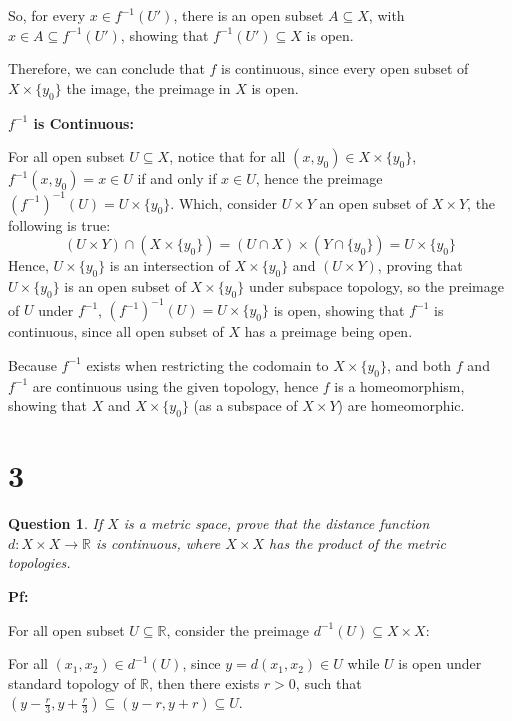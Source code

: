 \documentclass{article}
\newtheorem{question}{Question}
\begin{document}
So, for every $x\in f^{-1}(U')$, there is an open subset $A\subseteq X$, with $x\in A\subseteq f^{-1}(U')$, showing that $f^{-1}(U')\subseteq X$ is open.

Therefore, we can conclude that $f$ is continuous, since every open subset of $X\times \{y_0\}$ the image, the preimage in $X$ is open.

\hfill

\textbf{$f^{-1}$ is Continuous:}

For all open subset $U\subseteq X$, notice that for all $(x,y_0)\in X\times \{y_0\}$, $f^{-1}(x,y_0)=x\in U$ if and only if $x\in U$,
hence the preimage $(f^{-1})^{-1}(U) = U\times \{y_0\}$. Which, consider $U\times Y$ an open subset of $X\times Y$, the following is true:
$$(U\times Y)\cap (X\times \{y_0\}) = (U\cap X)\times (Y\cap \{y_0\}) = U\times \{y_0\}$$
Hence, $U\times \{y_0\}$ is an intersection of $X\times \{y_0\}$ and $(U\times Y)$, proving that $U\times \{y_0\}$ is an open subset of $X\times \{y_0\}$ under subspace topology,
so the preimage of $U$ under $f^{-1}$, $(f^{-1})^{-1}(U) = U\times \{y_0\}$ is open, showing that $f^{-1}$ is continuous, since all open subset of $X$ has a preimage being open.

\hfill

Because $f^{-1}$ exists when restricting the codomain to $X\times \{y_0\}$, and both $f$ and $f^{-1}$ are continuous using the given topology,
hence $f$ is a homeomorphism, showing that $X$ and $X\times \{y_0\}$ (as a subspace of $X\times Y$) are homeomorphic.

\break

\section*{3}
\begin{myBox}[]{}
    \begin{question}
        If $X$ is a metric space, prove that the distance function $d:X\times X\rightarrow \mathbb{R}$ is
        continuous, where $X\times X$ has the product of the metric topologies.
    \end{question}
\end{myBox}

\textbf{Pf:}

For all open subset $U\subseteq \mathbb{R}$, consider the preimage $d^{-1}(U)\subseteq X\times X$:

For all $(x_1,x_2)\in d^{-1}(U)$, since $y=d(x_1,x_2)\in U$ while $U$ is open under standard topology of $\mathbb{R}$, 
then there exists $r>0$, such that $(y-\frac{r}{3},y+\frac{r}{3})\subseteq (y-r,y+r) \subseteq U$.
\end{document}
